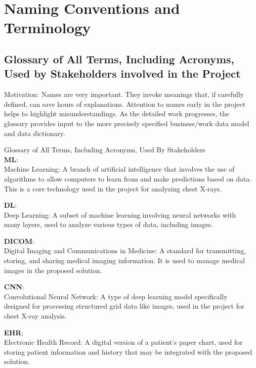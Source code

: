 \documentclass[12pt]{article}
\begin{document}
\section{Naming Conventions and Terminology}


\subsection{Glossary of All Terms, Including Acronyms, Used by Stakeholders involved in the Project}

Motivation: Names are very important. They invoke meanings that, if carefully defined, can save hours of explanations. Attention to names early in the project helps to highlight misunderstandings. As the detailed work progresses, the glossary provides input to the more precisely specified business/work data model and data dictionary.

Glossary of All Terms, Including Acronyms, Used By Stakeholders\\

\textbf{ML}:\\
Machine Learning: A branch of artificial intelligence that involves the use of algorithms to allow computers to learn from and make predictions based on data. This is a core technology used in the project for analyzing chest X-rays.

\textbf{DL}:\\
Deep Learning: A subset of machine learning involving neural networks with many layers, used to analyze various types of data, including images.

\textbf{DICOM}:\\
Digital Imaging and Communications in Medicine: A standard for transmitting, storing, and sharing medical imaging information. It is used to manage medical images in the proposed solution.

\textbf{CNN}:\\
Convolutional Neural Network: A type of deep learning model specifically designed for processing structured grid data like images, used in the project for chest X-ray analysis.

\textbf{EHR}:\\
Electronic Health Record: A digital version of a patient's paper chart, used for storing patient information and history that may be integrated with the proposed solution.
\end{document}
